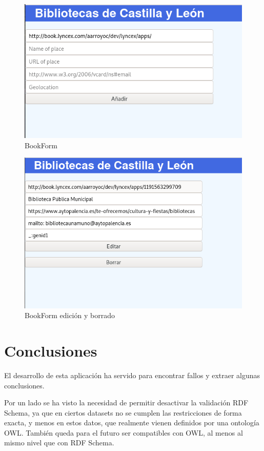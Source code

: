 \documentclass[openright,twoside,12pt]{book}
\begin{document}
\begin{figure}
    \centering
    \includegraphics[width=\textwidth]{tour/bibliocyl5.png}
    \caption{BookForm}
    \label{fig:bibliocyl5}
\end{figure}

\begin{figure}
    \centering
    \includegraphics[width=\textwidth]{tour/bibliocyl7.png}
    \caption{BookForm edición y borrado}
    \label{fig:bibliocyl7}
\end{figure}

\section{Conclusiones}

El desarrollo de esta aplicación ha servido para encontrar fallos y extraer algunas conclusiones.

Por un lado se ha visto la necesidad de permitir desactivar la validación RDF Schema, ya que en ciertos datasets no se cumplen las restricciones de forma exacta, y menos en estos datos, que realmente vienen definidos por una ontología OWL. También queda para el futuro ser compatibles con OWL, al menos al mismo nivel que con RDF Schema.
\end{document}
